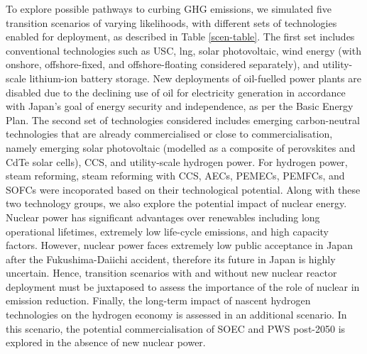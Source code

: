 To explore possible pathways to curbing \gls{GHG} emissions, we simulated five transition scenarios of varying likelihoods, with different sets of technologies enabled for deployment, as described in Table \ref{scen-table}. The first set includes conventional technologies such as  \gls{USC}, \gls{lng}, solar photovoltaic, wind energy (with onshore, offshore-fixed, and offshore-floating considered separately), and utility-scale lithium-ion battery storage. New deployments of oil-fuelled power plants are disabled due to the declining use of oil for electricity generation in accordance with Japan's goal of energy security and independence, as per the Basic Energy Plan. The second set of technologies considered includes emerging carbon-neutral technologies that are already commercialised or close to commercialisation, namely emerging solar photovoltaic (modelled as a composite of perovskites and CdTe solar cells), \gls{CCS}, and utility-scale hydrogen power. For hydrogen power, steam reforming, steam reforming with \gls{CCS}, \glspl{AEC}, \glspl{PEMEC}, \glspl{PEMFC}, and \glspl{SOFC} were incoporated based on their technological potential. Along with these two technology groups, we also explore the potential impact of nuclear energy. Nuclear power has significant advantages over renewables including long operational lifetimes, extremely low life-cycle emissions, and high capacity factors. However, nuclear power faces extremely low public acceptance in Japan after the Fukushima-Daiichi accident, therefore its future in Japan is highly uncertain. Hence, transition scenarios with and without new nuclear reactor deployment must be juxtaposed to assess the importance of the role of nuclear in emission reduction. Finally, the long-term impact of nascent hydrogen technologies on the hydrogen economy is assessed in an additional scenario. In this scenario, the potential commercialisation of \gls{SOEC} and \gls{PWS} post-2050 is explored in the absence of new nuclear power.

